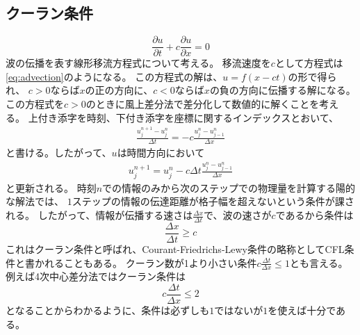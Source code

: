 \documentclass{jsarticle}
\newcommand{\pder}[2][]{\frac{\partial#1}{\partial#2}}
\begin{document}
\subsection{クーラン条件}
\begin{equation}
    \pder[u]{t} + c\pder[u]{x} = 0\label{eq:advection}
\end{equation}
波の伝播を表す線形移流方程式について考える。
移流速度を$c$として方程式は\eqref{eq:advection}のようになる。
この方程式の解は、$u = f(x -ct)$の形で得られ、
$c>0$ならば$x$の正の方向に、$c<0$ならば$x$の負の方向に伝播する解になる。
この方程式を$c>0$のときに風上差分法で差分化して数値的に解くことを考える。
上付き添字を時刻、下付き添字を座標に関するインデックスとおいて、
\begin{align}
    \frac{u^{n+1}_j - u^{n}_j}{\Delta t} = -c \frac{u^n_{j} - u^n_{j-1}}{\Delta x}
\end{align}
と書ける。したがって、$u$は時間方向において
\begin{align}
    u^{n+1}_j  =  u^{n}_j- c \Delta t\frac{u^n_{j} - u^n_{j-1}}{\Delta x}
\end{align}
と更新される。
時刻$n$での情報のみから次のステップでの物理量を計算する陽的な解法では、
$1$ステップの情報の伝達距離が格子幅を超えないという条件が課される。%
したがって、情報が伝播する速さは$\frac{\Delta x}{\Delta t}$で、波の速さが$c$であるから条件は
\begin{equation}
    \frac{\Delta x}{\Delta t} \geq c
\end{equation}
これはクーラン条件と呼ばれ、Courant-Friedrichs-Lewy条件の略称としてCFL条件と書かれることもある。
クーラン数が1より小さい条件$c\frac{\Delta t}{\Delta x} \leq 1$とも言える。
例えば4次中心差分法ではクーラン条件は
\begin{equation}
  c\frac{\Delta t}{\Delta x} \leq 2
\end{equation}
となることからわかるように、条件は必ずしも$1$ではないが$1$を使えば十分である。
\end{document}
